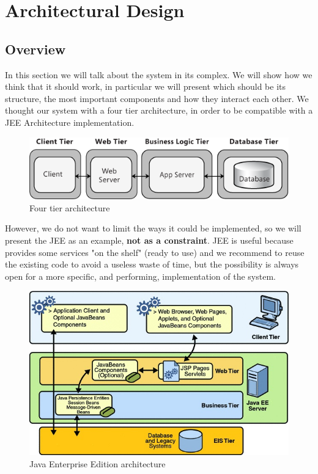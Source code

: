 \section{Architectural Design}
	\subsection{Overview}
	In this section we will talk about the system in its complex. We will show how we think that it should
	work, in particular we will present which should be its structure, the most important components and
	how they interact each other. We thought our system with a four tier architecture, in order to be compatible
	with a JEE Architecture implementation.
	\begin{figure}[h!]
		\includegraphics[width=\linewidth]{../SE2_IMAGES/4tier}
		\caption{Four tier architecture}
	\end{figure}
	\newline
	However, we do not want to limit the ways it could be implemented, so
	we will present the JEE as an example, \textbf{not as a constraint}. JEE is useful because provides some services
	"on the shelf" (ready to use) and we recommend to reuse the existing code to avoid a useless waste of time,
	but the possibility is always open for a more specific, and performing, implementation of the system.
	\clearpage
	\begin{figure}[h!]
		\includegraphics[width=\linewidth]{../SE2_IMAGES/jee}
		\caption{Java Enterprise Edition architecture}
	\end{figure}

